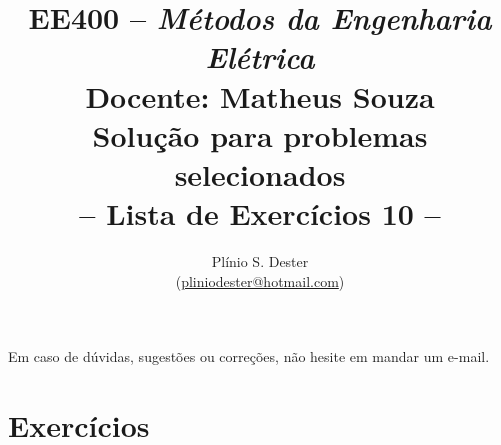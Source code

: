 \documentclass[answers, 12pt]{exam}
\title{	%
        EE400 -- \textit{Métodos da Engenharia Elétrica} \\[-0mm]
        {\Large Docente: Matheus Souza} \\[+1mm]
        {\Large Solução para problemas selecionados}\\[-0mm]
        -- Lista de Exercícios 10 --
}
\author{Plínio S. Dester\\ (\url{pliniodester@hotmail.com})}
\begin{document}
\maketitle

Em caso de dúvidas, sugestões ou correções, não hesite em mandar um e-mail.


\setcounter{section}{9}
\section{Exercícios}


% 

% 
\end{document}
